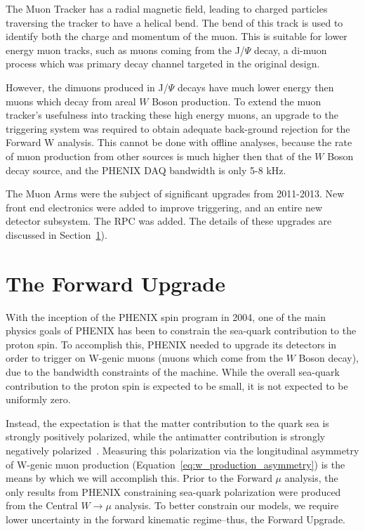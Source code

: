 The Muon Tracker has a radial magnetic field, leading to charged particles
traversing the tracker to have a helical bend. The bend of this track is used to
identify both the charge and momentum of the muon. This is suitable for lower
energy muon tracks, such as muons coming from the J/$\Psi$ decay, a di-muon
process which was primary decay channel targeted in the original design.

However, the dimuons produced in J/$\Psi$ decays have much lower energy then
muons which decay from areal $W$ Boson production. To extend the muon tracker's
usefulness into tracking these high energy muons, an upgrade to the triggering
system was required to obtain adequate back-ground rejection for the Forward W
analysis. This cannot be done with offline analyses, because the rate of muon
production from other sources is much higher then that of the $W$ Boson decay
source, and the PHENIX DAQ bandwidth is only 5-8 kHz.  

The Muon Arms were the subject of significant upgrades from 2011-2013.
New front end electronics were added to improve triggering, and an entire new
detector subsystem. The RPC was added. The details of these upgrades are
discussed in Section~\ref{sec:forward_upgrade}).
\clearpage

\section{The Forward Upgrade} 
\label{sec:forward_upgrade}

With the inception of the PHENIX spin program in 2004, one of the main physics
goals of PHENIX has been to constrain the sea-quark contribution to the proton
spin. To accomplish this, PHENIX needed to upgrade its detectors in order to
trigger on W-genic muons (muons which come from the $W$ Boson decay), due to the
bandwidth constraints of the machine. While the overall sea-quark contribution
to the proton spin is expected to be small, it is not expected to be uniformly
zero. 

Instead, the expectation is that the matter contribution to the quark sea is
strongly positively polarized, while the antimatter contribution is strongly
negatively polarized~\cite{Aidala2005}.  Measuring this polarization via the
longitudinal asymmetry of W-genic muon production
(Equation~\ref{eq:w_production_asymmetry}) is the means by which we will
accomplish this. Prior to the Forward $\mu$ analysis, the only results from
PHENIX constraining sea-quark polarization were produced from the Central
$W\rightarrow\mu$ analysis. To better constrain our models, we require lower
uncertainty in the forward kinematic regime--thus, the Forward Upgrade.

